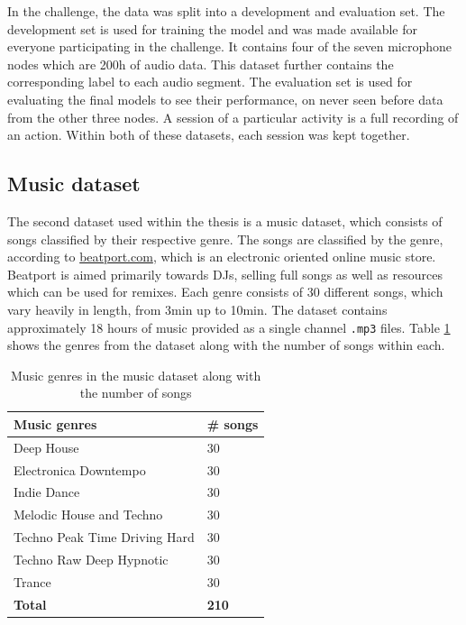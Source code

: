 \newline
\newline
In the challenge, the data was split into a development and evaluation set. The development set is used for training the model and was made available for everyone participating in the challenge. It contains four of the seven microphone nodes which are 200h of audio data. This dataset further contains the corresponding label to each audio segment. The evaluation set is used for evaluating the final models to see their performance, on never seen before data from the other three nodes. A session of a particular activity is a full recording of an action. Within both of these datasets, each session was kept together.

\subsection{Music dataset}
\label{sub:Music-Dataset}
The second dataset used within the thesis is a music dataset, which consists of songs classified by their respective genre. The songs are classified by the genre, according to \href{http://beatport.com}{beatport.com}, which is an electronic oriented online music store. Beatport is aimed primarily towards DJs, selling full songs as well as resources which can be used for remixes. Each genre consists of 30 different songs, which vary heavily in length, from 3min up to 10min. The dataset contains approximately 18 hours of music provided as a single channel \texttt{.mp3} files. Table \ref{tab:Music-Dataset} shows the genres from the dataset along with the number of songs within each.
\begin{table}[htbp]
    \centering
    \caption{Music genres in the music dataset along with the number of songs}
	\label{tab:Music-Dataset}
    \begin{tabular}{p{} | p{}}
        \toprule
        \textbf{Music genres} & \textbf{\# songs} \\ 
        \midrule[1pt]
        Deep House & 30 \\
        \hline
        Electronica Downtempo & 30 \\ 
        \hline
        Indie Dance & 30 \\ 
        \hline
        Melodic House and Techno & 30 \\ 
        \hline
        Techno Peak Time Driving Hard & 30 \\ 
        \hline
        Techno Raw Deep Hypnotic & 30 \\ 
        \hline
        Trance & 30 \\
        \midrule[1pt]
        \textbf{Total} & \textbf{210} \\
        \bottomrule
    \end{tabular}
\end{table}

